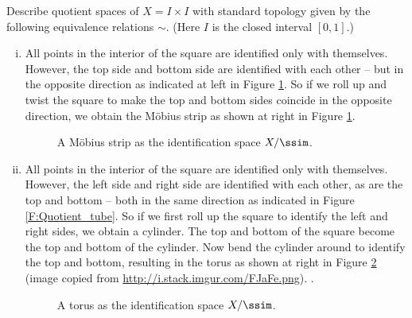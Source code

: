 \item Describe quotient spaces of $X = I \times I$ with standard topology given by the following equivalence relations $\sim$. (Here $I$ is the closed interval $[0,1]$.)
	\begin{enumerate}[i.]	
	\item All points in the interior of the square are identified only with themselves. However, the top side and bottom side are identified with each other -- but in the opposite direction as indicated at left in Figure \ref{F:Quotient_Mobius}. So if we roll up and twist the square to make the top and bottom sides coincide in the opposite direction, we obtain the M\"{o}bius strip as shown at right in Figure \ref{F:Quotient_Mobius}.
\begin{figure}[h]
\begin{center}
 \hspace{0.75in}  
\caption{A M\"{o}bius strip as the identification space $X/\ssim$.} 
\label{F:Quotient_Mobius}
\end{center}
\end{figure}

	
	\item All points in the interior of the square are identified only with themselves. However, the left side and right side are identified with each other, as are the top and bottom -- both in the same direction as indicated in Figure \ref{F:Quotient_tube}. So if we first roll up the square to identify the left and right sides, we obtain a cylinder. The top and bottom of the square become the top and bottom of the cylinder. Now bend the cylinder around to identify the top and bottom, resulting in the torus as shown at right in Figure \ref{F:Quotient_torus} (image copied from \url{http://i.stack.imgur.com/FJaFe.png}). . 
\begin{figure}[h]
\begin{center}
\caption{A torus as the identification space $X/\ssim$.} 
\label{F:Quotient_torus}
\end{center}
\end{figure}
	

\end{enumerate}
